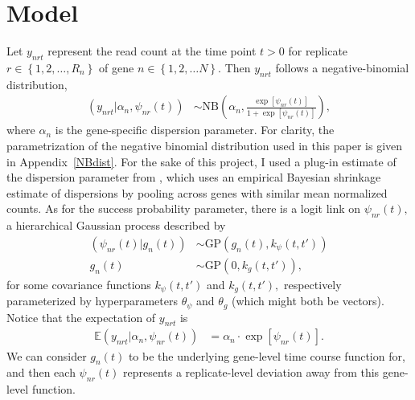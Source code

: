 \documentclass[11pt]{article}
\newcommand{\1}{\mathbf{1}}
\newcommand{\0}{\mathbf{0}}
\begin{document}

\section{Model}\label{Model}

Let $y_{nrt}$ represent the read count at the time point $t > 0$ for replicate $r \in \left\{ 1, 2, \ldots, R_n \right\}$ of gene $n \in \left\{ 1,2,\ldots N \right\}$. Then $y_{nrt}$ follows a negative-binomial distribution, 
%
%
%
\begin{align*}
	(y_{nrt} | \alpha_{n}, \psi_{nr}(t)) &\sim \text{NB}\left( \alpha_{n} , \frac{\exp\left[ \psi_{nr}(t) \right]}{1 + \exp\left[ \psi_{nr}(t) \right]} \right),
\end{align*}
%
%
%
where $\alpha_n$ is the gene-specific dispersion parameter. For clarity, the parametrization of the negative binomial distribution used in this paper is given in Appendix~\ref{NBdist}. For the sake of this project, I used a plug-in estimate of the dispersion parameter from \cite{DESeq2}, which uses an empirical Bayesian shrinkage estimate of dispersions by pooling across genes with similar mean normalized counts. As for the success probability parameter, there is a logit link on $\psi_{nr}(t),$ a hierarchical Gaussian process described by
%
%
\begin{align*}
	(\psi_{nr}(t) | g_n(t)) &\sim \text{GP}(g_n(t), k_\psi(t, t')) \\
	g_n(t) &\sim \text{GP}(0, k_g(t, t')),
\end{align*}
%
%
%
for some covariance functions $k_\psi(t, t')$ and $k_g(t, t'),$ respectively parameterized by hyperparameters $\theta_\psi$ and $\theta_g$ (which might both be vectors). Notice that the expectation of $y_{nrt}$ is 
%
%
\begin{align}
	\mathbb{E}(y_{nrt} | \alpha_n, \psi_{nr}(t)) &= \alpha_{n} \cdot \exp\left[ \psi_{nr}(t) \right]. \label{expectation}
\end{align} 
%
%
%
We can consider $g_n(t)$ to be the underlying gene-level time course function for, and then each $\psi_{nr}(t)$ represents a replicate-level deviation away from this gene-level function.


\end{document}
